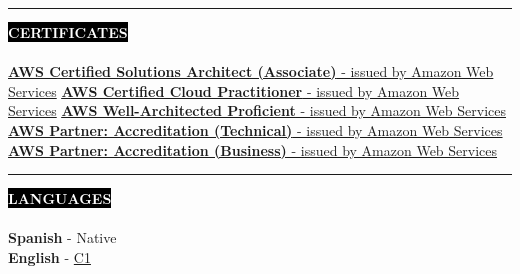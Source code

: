 \documentclass[10pt,A4]{article}
\newcounter{a}
\newcounter{b}
\newcounter{c}
\newcommand{\cvsection}[1] {
	\textcolor{white}{\MakeUppercase{\textbf{#1}}}
}
\newcommand{\cvsect}[1]{
	\colorbox{black}{{\cvsection{#1}}}\\\\%
}
\begin{document}
	
	\begin{minipage}[t]{0.8\textwidth}\hrule height 0pt width 0pt%
		\cvsect{Certificates}
		\href{https://www.credly.com/badges/dbb4510d-c80e-4bdf-bf9b-52e370013a9a}{\underline{\textbf{AWS Certified Solutions Architect (Associate)}} - issued by Amazon Web Services}\hfil\break
		\href{https://www.credly.com/badges/4f129c39-edb2-410c-91aa-d8bf8617706f}{\underline{\textbf{AWS Certified Cloud Practitioner}} - issued by Amazon Web Services}\hfil\break
		\href{https://www.credly.com/badges/1e0ac89f-4e38-4e91-93aa-3a62e7c33709}{\underline{\textbf{AWS Well-Architected Proficient}} - issued by Amazon Web Services}\hfil\break
		\href{https://www.credly.com/badges/4f7bb440-1f63-4b79-a7b1-116f16da0656}{\underline{\textbf{AWS Partner: Accreditation (Technical)}} - issued by Amazon Web Services}\hfil\break
		\href{https://www.credly.com/badges/c35e5c25-1938-4810-9489-1871644d7175}{\underline{\textbf{AWS Partner: Accreditation (Business)}} - issued by Amazon Web Services}\hfil\break
	\end{minipage}%
	\hspace{1cm}
	\begin{minipage}[t]{0.3\textwidth}\hrule height 0pt width 0pt%
		\cvsect{Languages}
		\textbf{Spanish} - Native\\
		\textbf{English} - \href{https://cert.efset.org/hqaFfD}{C1}\\
	\end{minipage}%
	\hfill
	\vspace{0.5cm}

	
\end{document}
